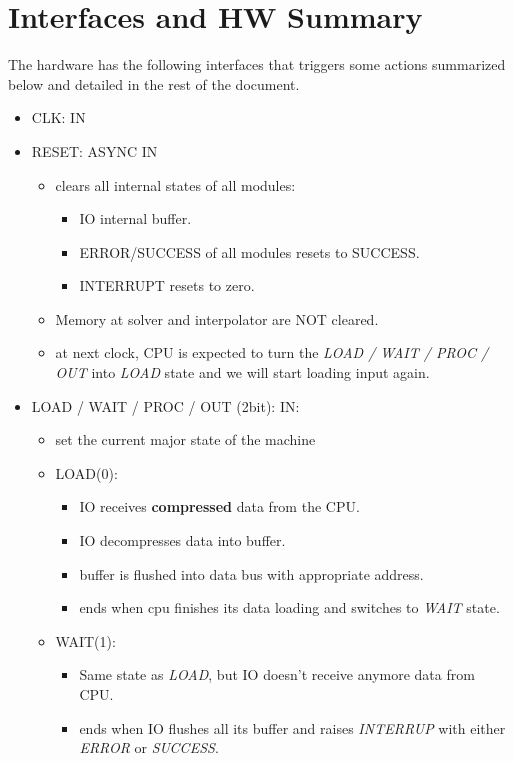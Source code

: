 \documentclass[12pt]{extarticle}
\begin{document}
\section{Interfaces and HW Summary}
The hardware has the following interfaces that triggers some actions summarized below and detailed in the rest of the document.
\begin{itemize}
    \item CLK: IN
    \item RESET: ASYNC IN
    \begin{itemize}
        \item clears all internal states of all modules:
        \begin{itemize}
            \item IO internal buffer.
            \item ERROR/SUCCESS of all modules resets to SUCCESS.
            \item INTERRUPT resets to zero.
        \end{itemize}
        \item Memory at solver and interpolator are NOT cleared.
        \item at next clock, CPU is expected to turn the \emph{LOAD / WAIT / PROC / OUT} into \emph{LOAD} state and we will start loading input again.
    \end{itemize}
    \item LOAD / WAIT / PROC / OUT (2bit): IN:
    \begin{itemize}
        \item set the current major state of the machine
        \item LOAD(0):
        \begin{itemize}
            \item IO receives \textbf{compressed} data from the CPU.
            \item IO decompresses data into buffer.
            \item buffer is flushed into data bus with appropriate address.
            \item ends when cpu finishes its data loading and switches to \emph{WAIT} state.
        \end{itemize}
        \item WAIT(1):
        \begin{itemize}
            \item Same state as \emph{LOAD}, but IO doesn't receive anymore data from CPU.
            \item ends when IO flushes all its buffer and raises \emph{INTERRUP} with either \emph{ERROR} or \emph{SUCCESS}.

\end{itemize}
\end{itemize}
\end{itemize}
\end{document}
